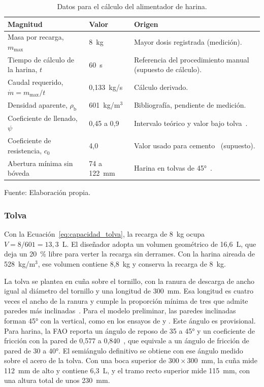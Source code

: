 \begin{table}[H]
    \centering
    \caption{Datos para el cálculo del alimentador de harina.}
    \label{tab:datos_alimentador}
    \footnotesize
    \renewcommand{\arraystretch}{1.15}
    \begin{tabularx}{\textwidth}{>{\raggedright\arraybackslash}p{}p{}>{\raggedright\arraybackslash}X}
        \toprule
        \textbf{Magnitud} & \textbf{Valor} & \textbf{Origen} \\
        \midrule
        Masa por recarga, $m_{\max}$ & 8~kg & Mayor dosis registrada (medición). \\
        Tiempo de cálculo de la harina, $t$ & 60~s & Referencia del procedimiento manual (supuesto de cálculo). \\
        Caudal requerido, $\dot{m} = m_{\max}/t$ & 0,133~kg/s & Cálculo derivado. \\
        Densidad aparente, $\rho_{\mathrm{b}}$ & 601~kg/m$^{3}$ & Bibliografía, pendiente de medición. \\
        Coeficiente de llenado, $\psi$ & 0,45 a 0,9 & Intervalo teórico y valor bajo tolva~\parencite{karwat2021screw}. \\
        Coeficiente de resistencia, $c_{0}$ & 4,0 & Valor usado para cemento~\parencite{karwat2021screw} (supuesto). \\
        Abertura mínima sin bóveda & 74 a 122~mm & Harina en tolvas de 45°~\parencite{su2017arching,guan2009flour}. \\
        \bottomrule
    \end{tabularx}
    \par\smallskip
    Fuente: Elaboración propia.
\end{table}

\subsubsection{Tolva}

Con la Ecuación~\eqref{eq:capacidad_tolva}, la recarga de 8~kg ocupa
$V = 8/601 = 13{,}3$~L. El diseñador adopta un volumen geométrico de
16,6~L, que deja un 20~\% libre para verter la recarga sin derrames. Con
la harina aireada de 528~kg/m$^{3}$, ese volumen contiene 8,8~kg y conserva
la recarga de 8~kg.

La tolva se plantea en cuña sobre el tornillo, con la ranura de descarga
de ancho igual al diámetro del tornillo y una longitud de 300~mm. Esa
longitud es cuatro veces el ancho de la ranura y cumple la proporción
mínima de tres que admite paredes más inclinadas~\parencite{mehos2016hopper}.
Para el modelo preliminar, las paredes inclinadas forman 45° con la
vertical, como en los ensayos de \textcite{su2017arching} y
\textcite{guan2009flour}. Este ángulo es provisional. Para harina, la FAO
reporta un ángulo de reposo de 35 a 45° y un coeficiente de fricción con
la pared de 0,577 a 0,840~\parencite{delucia1993granos}, que equivale a un
ángulo de fricción de pared de 30 a 40°. El semiángulo definitivo se
obtiene con ese ángulo medido sobre el acero de la tolva. Con una boca superior de $300 \times 300$~mm, la
cuña mide 112~mm de alto y contiene 6,3~L, y el tramo recto superior mide
115~mm, con una altura total de unos 230~mm.

